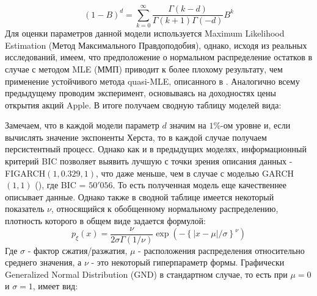 \begin{equation}
	(1 - B)^d = \sum_{k = 0}^\infty \frac{\Gamma(k - d)}{\Gamma(k + 1)\Gamma(-d)}B^k
\end{equation}
Для оценки параметров данной модели используется Maximum Likelihood Estimation (Метод Максимального Правдоподобия), однако, исходя из реальных исследований, имеем, что предположение о нормальном распределение остатков в случае с методом MLE (ММП) приводит к более плохому результату, чем применение устойчивого метода quasi-MLE, описанного в \cite{weiss1986asymptotic}. Аналогично всему предыдущему проводим эксперимент, основываясь на доходностях цены открытия акций Apple. В итоге получаем сводную таблицу моделей вида:



\noindent Замечаем, что в каждой модели параметр $d$ значим на $1\%$-ом уровне и, если вычислять значение экспоненты Херста, то в каждой случае получаем персистентный процесс. Однако как и в предыдущих моделях, информационный критерий BIC позволяет выявить лучшую с точки зрения описания данных - FIGARCH$(1, 0.329, 1)$, что даже меньше, чем в случае с моделью GARCH$(1, 1)$ (), где BIC = $50'056$. То есть полученная модель еще качественнее описывает данные. Однако также в сводной таблице имеется некоторый показатель $\nu$, относящийся к обобщенному нормальному распределению, плотность которого в общем виде задается формулой:
\begin{equation}
	p_\xi(x) = \frac{\nu}{2 \sigma \Gamma(1 / \nu)} \exp \left(-\left\{|x - \mu|/\sigma\right\}^\nu \right)
\end{equation}
Где $\sigma$ - фактор сжатия/разжатия, $\mu$ - расположения распределения относительно среднего значения, а $\nu$ - это некоторый гиперпараметр формы. Графически Generalized Normal Distribution (GND) в стандартном случае, то есть при $\mu = 0$ и $\sigma = 1$, имеет вид:
